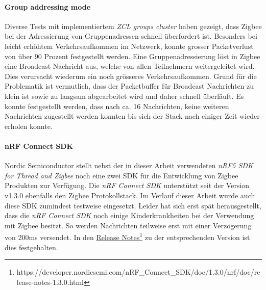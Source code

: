 \paragraph{Group addressing mode}
Diverse Tests mit implementiertem \textit{ZCL groups cluster} haben gezeigt, dass Zigbee bei der Adressierung von Gruppenadressen schnell überfordert ist.
Besonders bei leicht erhöhtem Verkehrsaufkommen im Netzwerk, konnte grosser Packetverlust von über 90 Prozent festgestellt werden.
Eine Gruppenadressierung löst in Zigbee eine Broadcast Nachricht aus, welche von allen Teilnehmern weitergeleitet wird.
Dies verursacht wiederum ein noch grösseres Verkehrsaufkommen. 
Grund für die Problematik ist vermutlich, dass der Packetbuffer für Broadcast Nachrichten zu klein ist sowie zu langsam abgearbeitet wird und daher schnell überläuft.
Es konnte festgestellt werden, dass nach ca. 16 Nachrichten, keine weiteren Nachrichten zugestellt werden konnten bis sich der Stack nach einiger Zeit wieder erholen konnte.

\paragraph{nRF Connect SDK}
Nordic Semiconductor stellt nebst der in dieser Arbeit verwendeten \textit{nRF5 SDK for Thread and Zigbee} noch eine zwei SDK für die Entwicklung von Zigbee Produkten zur Verfügung.
Die \textit{nRF Connect SDK} unterstützt seit der Version v1.3.0 ebenfalls den Zigbee Protokollstack.
Im Verlauf dieser Arbeit wurde auch diese SDK zumindest testweise eingesetzt.
Leider hat sich erst spät herausgestellt, dass die \textit{nRF Connect SDK} noch einige Kinderkrankheiten bei der Verwendung mit Zigbee besitzt.
So werden Nachrichten teilweise erst mit einer Verzögerung von 200ms versendet. In den \href{https://developer.nordicsemi.com/nRF_Connect_SDK/doc/1.3.0/nrf/doc/release-notes-1.3.0.html}{Release Notes\footnote{\url{https://developer.nordicsemi.com/nRF_Connect_SDK/doc/1.3.0/nrf/doc/release-notes-1.3.0.html}}} zu der entsprechenden Version ist dies festgehalten. 
